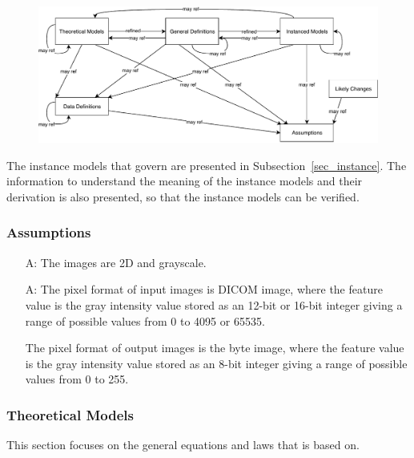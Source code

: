 \documentclass[12pt]{article}
\begin{document}
\begin{figure}[H]
  \includegraphics[scale=0.9]{RelationsBetweenTM_GD_IM_DD_A.pdf}
\end{figure}

The instance models that govern \progname{} are presented in
Subsection~\ref{sec_instance}. The information to understand the meaning of
the instance models and their derivation is also presented, so that the instance
models can be verified.

\subsubsection{Assumptions}
\label{sec_assumpt}

\begin{itemize}

\item[A\refstepcounter{assumpnum}\theassumpnum \label{A_2Dgrayscale}:]
The images are 2D and grayscale.

\item[A\refstepcounter{assumpnum}\theassumpnum \label{A_8bitinteger}:]
The pixel format of input images is DICOM image, where the feature value is the
gray intensity value stored as an 12-bit or 16-bit integer giving a range of
possible values from 0 to 4095 or 65535.

The pixel format of output images is the byte image, where the feature value is
the gray intensity value stored as an 8-bit integer giving a range of possible
values from 0 to 255.

\end{itemize}

\subsubsection{Theoretical Models} \label{sec_theoretical}

This section focuses on the general equations and laws that \progname{} is
based on.
\end{document}
